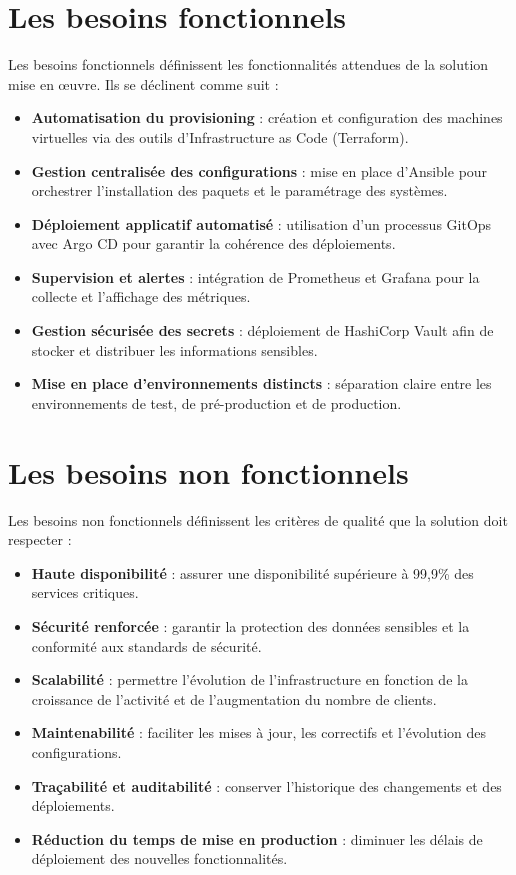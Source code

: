 \section{Les besoins fonctionnels}

Les besoins fonctionnels définissent les fonctionnalités attendues de la solution mise en œuvre. Ils se déclinent comme suit :

\begin{itemize}
    \item \textbf{Automatisation du provisioning} : création et configuration des machines virtuelles via des outils d'Infrastructure as Code (Terraform).
    \item \textbf{Gestion centralisée des configurations} : mise en place d'Ansible pour orchestrer l'installation des paquets et le paramétrage des systèmes.
    \item \textbf{Déploiement applicatif automatisé} : utilisation d'un processus GitOps avec Argo CD pour garantir la cohérence des déploiements.
    \item \textbf{Supervision et alertes} : intégration de Prometheus et Grafana pour la collecte et l'affichage des métriques.
    \item \textbf{Gestion sécurisée des secrets} : déploiement de HashiCorp Vault afin de stocker et distribuer les informations sensibles.
    \item \textbf{Mise en place d'environnements distincts} : séparation claire entre les environnements de test, de pré-production et de production.
\end{itemize}

\section{Les besoins non fonctionnels}

Les besoins non fonctionnels définissent les critères de qualité que la solution doit respecter :

\begin{itemize}
    \item \textbf{Haute disponibilité} : assurer une disponibilité supérieure à 99,9\% des services critiques.
    \item \textbf{Sécurité renforcée} : garantir la protection des données sensibles et la conformité aux standards de sécurité.
    \item \textbf{Scalabilité} : permettre l'évolution de l'infrastructure en fonction de la croissance de l'activité et de l'augmentation du nombre de clients.
    \item \textbf{Maintenabilité} : faciliter les mises à jour, les correctifs et l'évolution des configurations.
    \item \textbf{Traçabilité et auditabilité} : conserver l'historique des changements et des déploiements.
    \item \textbf{Réduction du temps de mise en production} : diminuer les délais de déploiement des nouvelles fonctionnalités.
\end{itemize}
